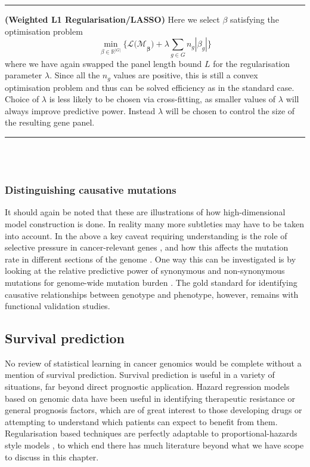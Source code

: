 \documentclass[thesis.tex]{subfiles}
\begin{document}
\hrule
\begin{technique}{\textbf{(Weighted L1 Regularisation/LASSO)}} 
Here we select $\beta$ satisfying the optimisation problem
$$\min_{\beta \in \mathbb{R}^{|G|}} \{\mathcal{L(M}_\mathbf{\beta}) + \lambda\sum\limits_{g \in G}n_g|\beta_g| \} $$
where we have again swapped the panel length bound $L$ for the regularisation parameter $\lambda$. Since all the $n_g$ values are positive, this is still a convex optimisation problem and thus can be solved efficiency as in the standard case. Choice of $\lambda$ is less likely to be chosen via cross-fitting, as smaller values of $\lambda$ will always improve predictive power. Instead $\lambda$ will be chosen to control the size of the resulting gene panel.

\end{technique}
\hrule
~\\~\\

\subsubsection{Distinguishing causative mutations}
It should again be noted that these are illustrations of how high-dimensional model construction is done. In reality many more subtleties may have to be taken into account. In the above a key caveat requiring understanding is the role of selective pressure in cancer-relevant genes \citep{bull_unlocking_2013}, and how this affects the mutation rate in different sections of the genome \citep{iengar_identifying_2018}. One way this can be investigated is by looking at the relative predictive power of synonymous and non-synonymous mutations for genome-wide mutation burden \citep{chu_nonsynonymous_2019}. The gold standard for identifying causative relationships between genotype and phenotype, however, remains with functional validation studies.

\subsection{Survival prediction}
No review of statistical learning in cancer genomics would be complete without a mention of survival prediction. Survival prediction is useful in a variety of situations, far beyond direct prognostic application. Hazard regression models based on genomic data have been useful in identifying therapeutic resistance \citep{seagle_discovery_2016} or general prognosis \citep{guinney_prediction_2017, zhang_lassobased_2018} factors, which are of great interest to those developing drugs or attempting to understand which patients can expect to benefit from them. Regularisation based techniques are perfectly adaptable to proportional-hazards style models \citep{benner_high-dimensional_2010}, to which end there has much literature beyond what we have scope to discuss in this chapter. 
\end{document}
